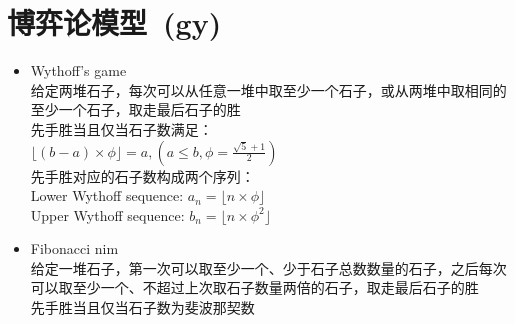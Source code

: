 \section{博弈论模型\ \small(gy)}
	\begin{itemize}
		\item Wythoff's game
			\\给定两堆石子，每次可以从任意一堆中取至少一个石子，或从两堆中取相同的至少一个石子，取走最后石子的胜
			\\先手胜当且仅当石子数满足：
			\\$\lfloor (b - a) \times \phi \rfloor=a, (a \leq b, \phi = \frac{\sqrt{5} + 1}{2})$
			\\先手胜对应的石子数构成两个序列：
			\\Lower Wythoff sequence: $a_n = \lfloor n \times \phi \rfloor$
			\\Upper Wythoff sequence: $b_n = \lfloor n \times \phi ^ 2 \rfloor$
		\item Fibonacci nim
			\\给定一堆石子，第一次可以取至少一个、少于石子总数数量的石子，之后每次可以取至少一个、不超过上次取石子数量两倍的石子，取走最后石子的胜
			\\先手胜当且仅当石子数为斐波那契数
	\end{itemize}

